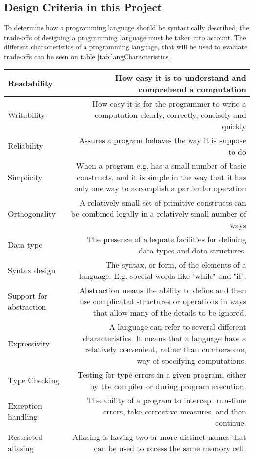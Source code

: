 \subsection{Design Criteria in this Project}
To determine how a programming language should be syntactically described, the trade-offs of designing a programming language must be taken into account. The different characteristics of a programming language, that will be used to evaluate trade-offs can be seen on table \ref{tab:langCharacteristics}.
\begin{table}[H]
	\begin{tabularx}{\textwidth}{|l|R|}
		\hline
		
		Readability				& How easy it is to understand and comprehend a computation 		\\ \hline
		Writability				& How easy it is for the programmer to write a computation clearly, correctly, concisely and quickly\\ \hline
		Reliability 			& Assures a program behaves the way it is suppose to do	\\ \hline
		Simplicity				& When a program e.g. has a small number of basic constructs, and it is simple in the way that it has only one way to 									accomplish a particular operation\\ \hline
		Orthogonality 			& A relatively small set of primitive constructs can be combined legally in a relatively small number of ways\\ \hline	
		Data type				& The presence of adequate facilities for defining data types and data structures.\\ \hline
		Syntax design			& The syntax, or form, of the elements of a language. E.g. special words like "while" and "if".\\ \hline
		Support for abstraction	& Abstraction means the ability to define and then use complicated structures or operations in ways that allow many of the 									details	to be ignored.\\ \hline
		Expressivity			& A language can refer to several different characteristics. It means that a language have a relatively convenient, rather 									than cumbersome, way of specifying computations.\\ \hline
		Type Checking			& Testing for type errors in a given program, either by the compiler or during program execution.\\ \hline
		Exception handling		& The ability of a program to intercept run-time errors, take corrective measures, and then continue.\\ \hline
		Restricted aliasing		& Aliasing is having two or more distinct names that can be used to	access the same memory cell.\\ \hline
		

\end{tabularx}
\end{table}
